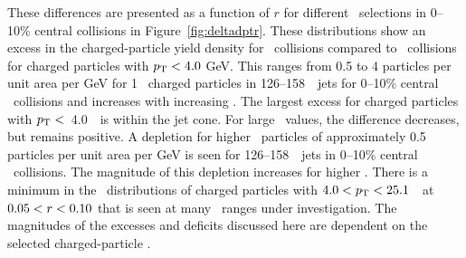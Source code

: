 These differences are presented as a function of $r$ for different \pt\ selections in 0--10\% central collisions in Figure~\ref{fig:deltadptr}.
These distributions show an excess in the charged-particle yield density for \pbpb\ collisions compared to \pp\ collisions for charged particles with $\mbox{$p_{\mathrm{T}}$} <4.0$ GeV.
This ranges from 0.5 to 4 particles per unit area per GeV for 1 \GeV\ charged particles in 126--158~\GeV\ jets for 0--10\% central \pbpb\ collisions and increases with increasing \ptjet.
The largest excess for charged particles with $\mbox{$p_{\mathrm{T}}$} <$~4.0~\GeV\ is within the jet cone.
For large \rvar\ values, the difference decreases, but remains positive.
A depletion for higher \pt\ particles of approximately 0.5 particles per unit area per GeV is seen for 126--158~\GeV\ jets in 0--10\% central \pbpb\ collisions.
The magnitude of this depletion increases for higher \ptjet.
There is a minimum in the \DeltaDptr\ distributions of charged particles with \mbox{$ 4.0 < \mbox{$p_{\mathrm{T}}$} <  25.1$}~\GeV\ at $0.05 < \mbox{$r$} < 0.10$ that is seen at many \ptjet\ ranges under investigation.
The magnitudes of the excesses and deficits discussed here are dependent on the selected charged-particle \pt.

